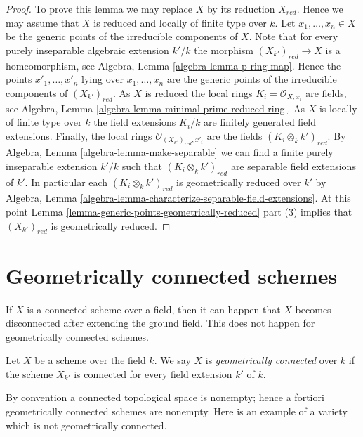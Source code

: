 \begin{proof}
To prove this lemma we may replace $X$ by its reduction $X_{red}$.
Hence we may assume that $X$ is reduced and locally of finite type
over $k$.
Let $x_1, \ldots, x_n \in X$ be the generic points of the irreducible
components of $X$.
Note that for every purely inseparable algebraic extension $k'/k$
the morphism $(X_{k'})_{red} \to X$ is a homeomorphism, see
Algebra, Lemma \ref{algebra-lemma-p-ring-map}. Hence the points
$x'_1, \ldots, x'_n$ lying over $x_1, \ldots, x_n$ are the generic
points of the irreducible components of $(X_{k'})_{red}$.
As $X$ is reduced the local rings $K_i = \mathcal{O}_{X, x_i}$ are fields, see
Algebra, Lemma \ref{algebra-lemma-minimal-prime-reduced-ring}.
As $X$ is locally of finite type over $k$ the field extensions
$K_i/k$ are finitely generated field extensions.
Finally, the local rings $\mathcal{O}_{(X_{k'})_{red}, x'_i}$ are the
fields $(K_i \otimes_k k')_{red}$. By
Algebra, Lemma \ref{algebra-lemma-make-separable}
we can find a finite purely inseparable extension $k'/k$
such that $(K_i \otimes_k k')_{red}$ are separable field
extensions of $k'$. In particular each $(K_i \otimes_k k')_{red}$
is geometrically reduced over $k'$ by
Algebra, Lemma \ref{algebra-lemma-characterize-separable-field-extensions}.
At this point
Lemma \ref{lemma-generic-points-geometrically-reduced} part (3)
implies that $(X_{k'})_{red}$ is geometrically reduced.
\end{proof}







\section{Geometrically connected schemes}
\label{section-geometrically-connected}

\noindent
If $X$ is a connected scheme over a field, then it can happen that $X$
becomes disconnected after extending the ground field. This does not happen
for geometrically connected schemes.

\begin{definition}
\label{definition-geometrically-connected}
Let $X$ be a scheme over the field $k$. We say $X$ is
{\it geometrically connected} over $k$ if the scheme $X_{k'}$ is connected
for every field extension $k'$ of $k$.
\end{definition}

\noindent
By convention a connected topological space is nonempty; hence a fortiori
geometrically connected schemes are nonempty.
Here is an example of a variety which is not geometrically connected.

